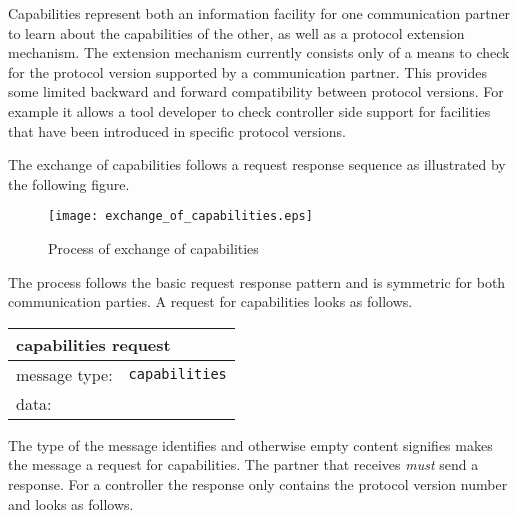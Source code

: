 \documentclass{article}
\newcommand{\msg}[1]{\texttt{#1}}
\begin{document}
   Capabilities represent both an information facility for one communication
   partner to learn about the capabilities of the other, as well as a protocol
   extension mechanism. The extension mechanism currently consists only of a
   means to check for the protocol version supported by a communication
   partner. This provides some limited backward and forward compatibility
   between protocol versions.  For example it allows a tool developer to check
   controller side support for facilities that have been introduced in specific
   protocol versions.
   
   \noindent The exchange of capabilities follows a request response sequence
   as illustrated by the following figure.
   
   \begin{figure}[H]
    \begin{center}
     \texttt{[image: exchange\_of\_capabilities.eps]}
    \end{center}
    \vspace{-0.3cm}
    \caption{Process of exchange of capabilities}
   \end{figure}

   \noindent The process follows the basic request response pattern and is
   symmetric for both communication parties. A request for capabilities looks
   as follows.
   
   \begin{table}[H]
    \begin{center}
     \begin{tabular}{|ll|}
      \hline
       \multicolumn{2}{|l|}{\textbf{capabilities request}} \\
      \hline
       message type:    & \msg{capabilities} \\
      \hline
       data:            & \\
      \hline
     \end{tabular}
     \vspace{-0.3cm}
    \end{center}
   \end{table}

   \noindent The type of the message identifies and otherwise empty content
   signifies makes the message a request for capabilities. The partner that
   receives \emph{must} send a response. For a controller the response only
   contains the protocol version number and looks as follows.
\end{document}
